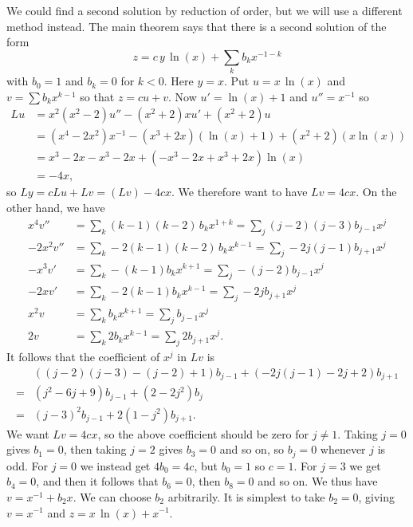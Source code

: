 \documentclass[a4paper]{amsart}
\begin{document}
\begin{solution}
 We could find a second solution by reduction of order, but we will
 use a different method instead.  The main theorem says that there is
 a second solution of the form  
 \[ z = c\,y\,\ln(x) + \sum_k b_k x^{-1-k} \]
 with $b_0=1$ and $b_k=0$ for $k<0$.  Here $y=x$.  Put $u=x\,\ln(x)$
 and $v=\sum b_kx^{k-1}$ so that $z=cu+v$.  Now $u'=\ln(x)+1$ and
 $u''=x^{-1}$ so 
 \begin{align*}
  Lu &= x^2(x^2-2) u'' - (x^2+2)xu' + (x^2+2)u \\
     &= (x^4-2x^2)x^{-1} - (x^3+2x)(\ln(x)+1) + (x^2+2)(x\ln(x)) \\
     &= x^3-2x-x^3-2x +(-x^3-2x+x^3+2x)\ln(x) \\
     &= -4x,
 \end{align*}
 so $Ly=cLu+Lv=(Lv)-4cx$.  We therefore want to have $Lv=4cx$.
 On the other hand, we have
 \begin{align*}
    x^4v'' &= \sum_k (k-1)(k-2)\,b_kx^{1+k} 
            = \sum_j (j-2)(j-3)b_{j-1}x^{j} \\
  -2x^2v'' &= \sum_k -2(k-1)(k-2)\,b_k x^{k-1} 
            = \sum_j -2j(j-1)b_{j+1} x^j \\
   -x^3v'  &= \sum_k -(k-1)b_kx^{k+1}
            = \sum_j -(j-2)b_{j-1}x^j \\
  -2x  v'  &= \sum_k -2(k-1)b_k x^{k-1} 
            = \sum_j -2jb_{j+1}x^j \\
    x^2v   &= \sum_k b_kx^{k+1}
            = \sum_j b_{j-1}x^j \\
      2v   &= \sum_k 2b_kx^{k-1}
            = \sum_j 2b_{j+1}x^j.
 \end{align*}
 It follows that the coefficient of $x^j$ in $Lv$ is 
 \begin{align*}
  & ((j-2)(j-3)-(j-2)+1)b_{j-1} + (-2j(j-1)-2j+2)b_{j+1} \\
  =& (j^2-6j+9)b_{j-1} + (2-2j^2)b_j \\
  =& (j-3)^2b_{j-1}+2(1-j^2)b_{j+1}.
 \end{align*}
 We want $Lv=4cx$, so the above coefficient should be zero for
 $j\neq 1$.  Taking $j=0$ gives $b_1=0$, then taking $j=2$ gives
 $b_3=0$ and so on, so $b_j=0$ whenever $j$ is odd.  For $j=0$ we
 instead get $4b_0=4c$, but $b_0=1$ so $c=1$.  For $j=3$ we get
 $b_4=0$, and then it follows that $b_6=0$, then $b_8=0$ and so on.
 We thus have $v=x^{-1}+b_2x$.  We can choose $b_2$ arbitrarily.  It
 is simplest to take $b_2=0$, giving $v=x^{-1}$ and
 $z=x\,\ln(x)+x^{-1}$.  
\end{solution}
\end{document}
